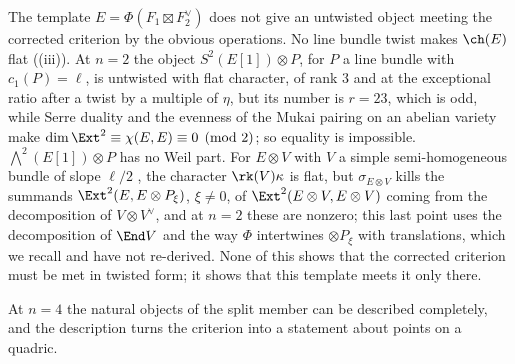 \begin{remark}[Untwisting]\label{rem:untwisting}
The template $E=\Phi(F_{1}\boxtimes F_{2}^{\vee})$ does not give an untwisted
object meeting the corrected criterion by the obvious operations. No line
bundle twist makes $\ch(E)$ flat ((iii)). At $n=2$ the
object $S^{2}(E[1])\otimes P$, for $P$ a line bundle with $c_{1}(P)=\ell$, is
untwisted with flat character, of rank $3$ and at the exceptional ratio after
a twist by a multiple of $\eta$, but its number is $r=23$, which is odd, while
Serre duality and the evenness of the Mukai pairing on an abelian variety make
$\dim\Ext^{2}\equiv\chi(E,E)\equiv0\pmod2$; so equality is impossible.
$\bigwedge^{2}(E[1])\otimes P$ has no Weil part. For $E\otimes V$ with $V$ a
simple semi-homogeneous bundle of slope $\ell/2$ \cite{Muk78}, the character
$\rk(V)\kappa$ is flat, but $\sigma_{E\otimes V}$ kills the summands
$\Ext^{2}(E,E\otimes P_{\xi})$, $\xi\ne0$, of $\Ext^{2}(E\otimes V,E\otimes V)$
coming from the decomposition of $V\otimes V^{\vee}$, and at $n=2$ these are
nonzero; this last point uses the decomposition of $\End V$ and the way
$\Phi$ intertwines $\otimes P_{\xi}$ with translations, which we recall and
have not re-derived. None of this shows that the corrected criterion must be
met in twisted form; it shows that this template meets it only there.
\end{remark}

At $n=4$ the natural objects of the split member can be described completely,
and the description turns the criterion into a statement about points on a
quadric.

